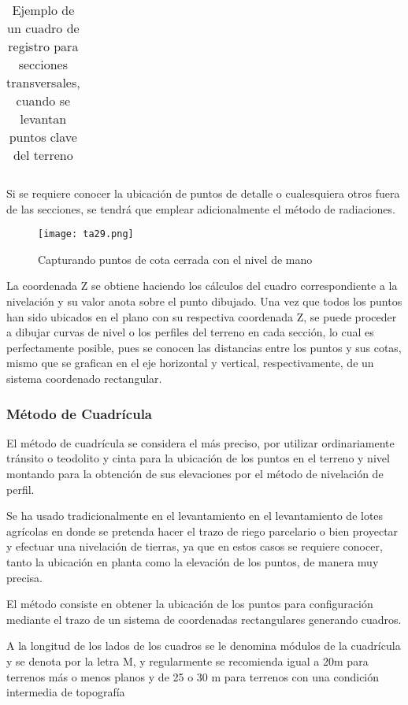\begin{table}[h!]
\begin{tabular}{cccccccccc}
    \end{tabular}
    \caption{Ejemplo de un cuadro de registro para secciones transversales, cuando se levantan puntos clave del terreno}
    \label{tabta9}
\end{table}

Si se requiere conocer la ubicación de puntos de detalle o cualesquiera otros fuera de las secciones, se tendrá que emplear adicionalmente el método de radiaciones.

\begin{figure}[h!]
\centering
  \texttt{[image: ta29.png]}
  \caption{Capturando puntos de cota cerrada con el nivel de mano}
  \label{ta29}
\end{figure}

La coordenada Z se obtiene haciendo los cálculos del cuadro correspondiente a la nivelación y su valor anota sobre el punto dibujado. Una vez que todos los puntos han sido ubicados en el plano con su respectiva coordenada Z, se puede proceder a dibujar curvas de nivel o los perfiles del terreno en cada sección, lo cual es perfectamente posible, pues se conocen las distancias entre los puntos y sus cotas, mismo que se grafican en el eje horizontal y vertical, respectivamente, de un sistema coordenado rectangular.

\subsubsection{Método de Cuadrícula}

El método de cuadrícula se considera el más preciso, por utilizar ordinariamente tránsito o teodolito y cinta para la ubicación de los puntos en el terreno y nivel montando para la obtención de sus elevaciones por el método de nivelación de perfil.

Se ha usado tradicionalmente en el levantamiento en el levantamiento de lotes agrícolas en donde se pretenda hacer el trazo de riego parcelario o bien proyectar y efectuar una nivelación de tierras, ya que en estos casos se requiere conocer, tanto la ubicación en planta como la elevación de los puntos, de manera muy precisa.

El método consiste en obtener la ubicación de los puntos para configuración mediante el trazo de un sistema de coordenadas rectangulares generando cuadros.

A la longitud de los lados de los cuadros se le denomina módulos de la cuadrícula y se denota por la letra M, y regularmente se recomienda igual a 20m para terrenos más o menos planos y de 25 o 30 m para terrenos con una condición intermedia de topografía 

